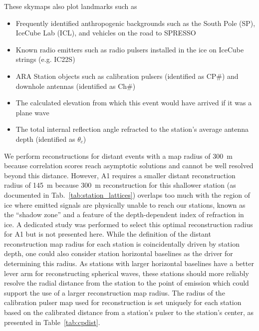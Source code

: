     These skymaps also plot landmarks such as
    \begin{itemize}
      \item Frequently identified anthropogenic backgrounds such as the South Pole (SP), IceCube Lab (ICL), and vehicles on the road to SPRESSO
      \item Known radio emitters such as radio pulsers installed in the ice on IceCube strings (e.g. IC22S)
      \item ARA Station objects such as calibration pulsers (identified as CP\#) and downhole antennas (identified as Ch\#)
      \item The calculated elevation from which this event would have arrived if it was a plane wave
      \item The total internal reflection angle refracted to the station's average antenna depth (identified as $\theta_c$)
    \end{itemize}


    We perform reconstructions for distant events with a map radius of 300~m because correlation scores reach asymptotic solutions and cannot be well resolved beyond this distance.%
    However, A1 requires a smaller distant reconstruction radius of 145~m because 300~m reconstruction for this shallower station (as documented in Tab.~\ref{tab:station_lattices}) overlaps too much with the region of ice where emitted signals are physically unable to reach our stations, known as the ``shadow zone'' and a feature of the depth-dependent index of refraction in ice.
    A dedicated study was performed to select this optimal reconstruction radius for A1 but is not presented here.
    While the definition of the distant reconstruction map radius for each station is coincidentally driven by station depth, one could also consider station horizontal baselines as the driver for determining this radius. 
    As stations with larger horizontal baselines have a better lever arm for reconstructing spherical waves, these stations should more reliably resolve the radial distance from the station to the point of emission which could support the use of a larger reconstruction map radius.%
    The radius of the calibration pulser map used for reconstruction is set uniquely for each station based on the calibrated distance from a station's pulser to the station's center, as presented in Table~\ref{tab:cpdist}.

